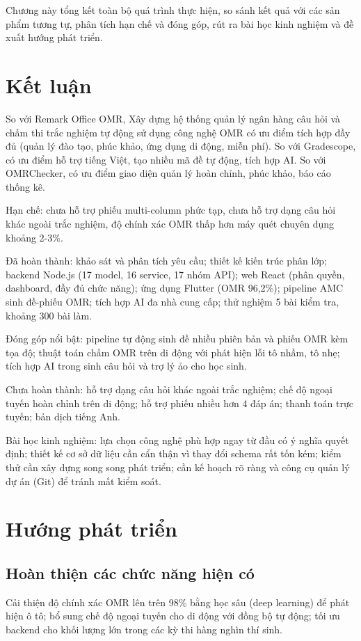 ﻿\documentclass[../DoAn.tex]{subfiles}
\begin{document}
Chương này tổng kết toàn bộ quá trình thực hiện, so sánh kết quả với các sản phẩm tương tự, phân tích hạn chế và đóng góp, rút ra bài học kinh nghiệm và đề xuất hướng phát triển.

\section{Kết luận}
\label{section:6.1}

So với Remark Office OMR, Xây dựng hệ thống quản lý ngân hàng câu hỏi và chấm thi trắc nghiệm tự động sử dụng công nghệ OMR có ưu điểm tích hợp đầy đủ (quản lý đào tạo, phúc khảo, ứng dụng di động, miễn phí). So với Gradescope, có ưu điểm hỗ trợ tiếng Việt, tạo nhiều mã đề tự động, tích hợp AI. So với OMRChecker, có ưu điểm giao diện quản lý hoàn chỉnh, phúc khảo, báo cáo thống kê.

Hạn chế: chưa hỗ trợ phiếu multi-column phức tạp, chưa hỗ trợ dạng câu hỏi khác ngoài trắc nghiệm, độ chính xác OMR thấp hơn máy quét chuyên dụng khoảng 2-3\%.

Đã hoàn thành: khảo sát và phân tích yêu cầu; thiết kế kiến trúc phân lớp; backend Node.js (17 model, 16 service, 17 nhóm API); web React (phân quyền, dashboard, đầy đủ chức năng); ứng dụng Flutter (OMR 96,2\%); pipeline AMC sinh đề-phiếu OMR; tích hợp AI đa nhà cung cấp; thử nghiệm 5 bài kiểm tra, khoảng 300 bài làm.

Đóng góp nổi bật: pipeline tự động sinh đề nhiều phiên bản và phiếu OMR kèm tọa độ; thuật toán chấm OMR trên di động với phát hiện lỗi tô nhầm, tô nhẹ; tích hợp AI trong sinh câu hỏi và trợ lý ảo cho học sinh.

Chưa hoàn thành: hỗ trợ dạng câu hỏi khác ngoài trắc nghiệm; chế độ ngoại tuyến hoàn chỉnh trên di động; hỗ trợ phiếu nhiều hơn 4 đáp án; thanh toán trực tuyến; bản dịch tiếng Anh.

Bài học kinh nghiệm: lựa chọn công nghệ phù hợp ngay từ đầu có ý nghĩa quyết định; thiết kế cơ sở dữ liệu cần cẩn thận vì thay đổi schema rất tốn kém; kiểm thử cần xây dựng song song phát triển; cần kế hoạch rõ ràng và công cụ quản lý dự án (Git) để tránh mất kiểm soát.

\section{Hướng phát triển}
\label{section:6.2}

\subsection{Hoàn thiện các chức năng hiện có}
Cải thiện độ chính xác OMR lên trên 98\% bằng học sâu (deep learning) để phát hiện ô tô; bổ sung chế độ ngoại tuyến cho di động với đồng bộ tự động; tối ưu backend cho khối lượng lớn trong các kỳ thi hàng nghìn thí sinh.
\end{document}
